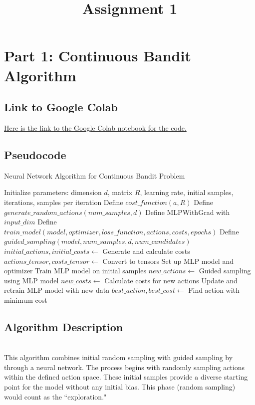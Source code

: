 \documentclass{article}
\title{Assignment 1}
\date{}
\author{}
\begin{document}
\maketitle
\section*{Part 1: Continuous Bandit Algorithm}
\subsection*{Link to Google Colab}
\href{https://colab.research.google.com/drive/1vRuHc6DXpbGOX94KGNAtKen7xMg2giJH?usp=sharing}{Here is the link to the Google Colab notebook for the code.}


\subsection*{Pseudocode}
\begin{algorithm}
    \caption{Neural Network Algorithm for Continuous Bandit Problem}
    \begin{algorithmic}[1]
    \State Initialize parameters: dimension $d$, matrix $R$, learning rate, initial samples, iterations, samples per iteration
    \State Define $cost\_function(a, R)$
    \State Define $generate\_random\_actions(num\_samples, d)$
    \State Define MLPWithGrad with $input\_dim$
    \State Define $train\_model(model, optimizer, loss\_function, actions, costs, epochs)$
    \State Define $guided\_sampling(model, num\_samples, d, num\_candidates)$
    \State $initial\_actions, initial\_costs \gets$ Generate and calculate costs
    \State $actions\_tensor, costs\_tensor \gets$ Convert to tensors
    \State Set up MLP model and optimizer
    \State Train MLP model on initial samples
        \State $new\_actions \gets$ Guided sampling using MLP model
        \State $new\_costs \gets$ Calculate costs for new actions
        \State Update and retrain MLP model with new data
    \EndFor
    \State $best\_action, best\_cost \gets$ Find action with minimum cost
    \end{algorithmic}
    \end{algorithm}

\subsection*{Algorithm Description}
\hfill\\ 
This algorithm combines initial random sampling with guided sampling by through a neural network. 
The process begins with randomly sampling actions within the defined action space. 
These initial samples provide a diverse starting point for the model without any initial bias.
This phase (random sampling) would count as the ``exploration."\\
\end{document}
